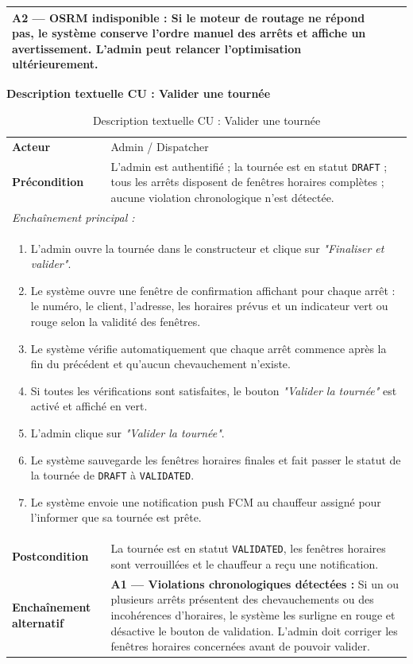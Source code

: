\begin{longtable}{|p{3.5cm}|p{11.5cm}|}
  \textbf{A2 — OSRM indisponible :} Si le moteur de routage ne répond pas,
  le système conserve l'ordre manuel des arrêts et affiche un avertissement.
  L'admin peut relancer l'optimisation ultérieurement. \\
\hline
\end{longtable}

\textbf{Description textuelle CU : Valider une tournée}

\begin{longtable}{|p{3.5cm}|p{11.5cm}|}
\caption{Description textuelle CU : Valider une tournée} \\
\hline
\rowcolor{primary!10}
\multicolumn{2}{|c|}{\textbf{CU : Valider une tournée}} \\
\hline
\textbf{Acteur} & Admin / Dispatcher \\
\hline
\textbf{Précondition} &
  L'admin est authentifié ; la tournée est en statut \texttt{DRAFT} ;
  tous les arrêts disposent de fenêtres horaires complètes ; aucune
  violation chronologique n'est détectée. \\
\hline
\multicolumn{2}{|l|}{\textit{Enchaînement principal :}} \\
\hline
\multicolumn{2}{|p{15.4cm}|}{
  \begin{enumerate}[leftmargin=1.5cm]
    \item L'admin ouvre la tournée dans le constructeur et clique sur
          \textit{"Finaliser et valider"}.
    \item Le système ouvre une fenêtre de confirmation affichant pour chaque
          arrêt : le numéro, le client, l'adresse, les horaires prévus
          et un indicateur vert ou rouge selon la validité des fenêtres.
    \item Le système vérifie automatiquement que chaque arrêt commence
          après la fin du précédent et qu'aucun chevauchement n'existe.
    \item Si toutes les vérifications sont satisfaites, le bouton
          \textit{"Valider la tournée"} est activé et affiché en vert.
    \item L'admin clique sur \textit{"Valider la tournée"}.
    \item Le système sauvegarde les fenêtres horaires finales et fait
          passer le statut de la tournée de \texttt{DRAFT} à
          \texttt{VALIDATED}.
    \item Le système envoie une notification push FCM au chauffeur
          assigné pour l'informer que sa tournée est prête.
  \end{enumerate}
} \\
\hline
\textbf{Postcondition} &
  La tournée est en statut \texttt{VALIDATED}, les fenêtres horaires
  sont verrouillées et le chauffeur a reçu une notification. \\
\hline
\textbf{Enchaînement alternatif} &
  \textbf{A1 — Violations chronologiques détectées :} Si un ou plusieurs
  arrêts présentent des chevauchements ou des incohérences d'horaires,
  le système les surligne en rouge et désactive le bouton de validation.
  L'admin doit corriger les fenêtres horaires concernées avant de
  pouvoir valider.


\end{longtable}
